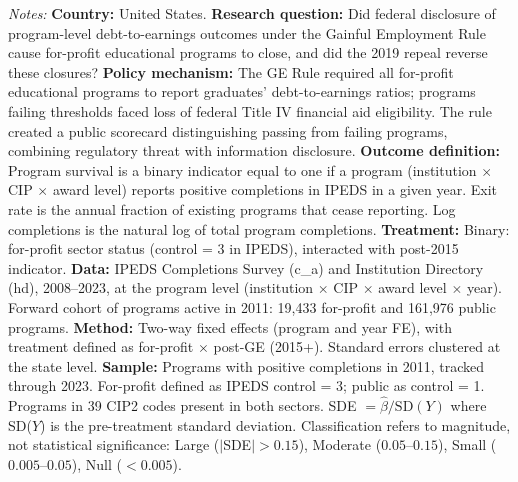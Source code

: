 \begin{table}[H]
\begin{minipage}{\textwidth}
{\footnotesize \textit{Notes:} \textbf{Country:} United States. \textbf{Research question:} Did federal disclosure of program-level debt-to-earnings outcomes under the Gainful Employment Rule cause for-profit educational programs to close, and did the 2019 repeal reverse these closures? \textbf{Policy mechanism:} The GE Rule required all for-profit educational programs to report graduates' debt-to-earnings ratios; programs failing thresholds faced loss of federal Title IV financial aid eligibility. The rule created a public scorecard distinguishing passing from failing programs, combining regulatory threat with information disclosure. \textbf{Outcome definition:} Program survival is a binary indicator equal to one if a program (institution $\times$ CIP $\times$ award level) reports positive completions in IPEDS in a given year. Exit rate is the annual fraction of existing programs that cease reporting. Log completions is the natural log of total program completions. \textbf{Treatment:} Binary: for-profit sector status (control = 3 in IPEDS), interacted with post-2015 indicator. \textbf{Data:} IPEDS Completions Survey (c\_a) and Institution Directory (hd), 2008--2023, at the program level (institution $\times$ CIP $\times$ award level $\times$ year). Forward cohort of programs active in 2011: 19,433 for-profit and 161,976 public programs. \textbf{Method:} Two-way fixed effects (program and year FE), with treatment defined as for-profit $\times$ post-GE (2015+). Standard errors clustered at the state level. \textbf{Sample:} Programs with positive completions in 2011, tracked through 2023. For-profit defined as IPEDS control = 3; public as control = 1. Programs in 39 CIP2 codes present in both sectors. SDE $= \hat{\beta} / \text{SD}(Y)$ where SD($Y$) is the pre-treatment standard deviation. Classification refers to magnitude, not statistical significance: Large ($|$SDE$| > 0.15$), Moderate ($0.05$--$0.15$), Small ($0.005$--$0.05$), Null ($< 0.005$).
}
\end{minipage}
\end{table}
